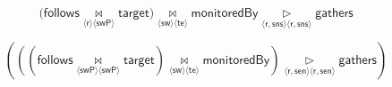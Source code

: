 \documentclass[a4paper,10pt]{article}
\newcommand{\tuple}[1]{\langle #1 \rangle}
\newcommand{\joinsymbol}{\bowtie}
\newcommand{\antijoinsymbol}{\, \triangleright \,}
\newcommand{\join}[2]{\!\underset{\tuple{\mathsf{#1}} \tuple{\mathsf{#2}}}{\joinsymbol}\!}
\newcommand{\antijoin}[2]{\!\underset{\tuple{\mathsf{#1}} \tuple{\mathsf{#2}}}{\antijoinsymbol}\!}
\newcommand{\relation}[1]{\mathsf{#1}}
\begin{document}

$$\Big(\relation{follows} \join{r}{swP} \relation{target}\Big) \join{sw}{te} \relation{monitoredBy} \antijoin{\relation{r,sns}}{\relation{r,sns}} \relation{gathers}$$

$$\left(\left(\left(\relation{follows} \join{swP}{swP} \relation{target}\right) \join{sw}{te} \relation{monitoredBy}\right) \antijoin{r,sen}{r,sen} \relation{gathers}\right)$$
\end{document}
